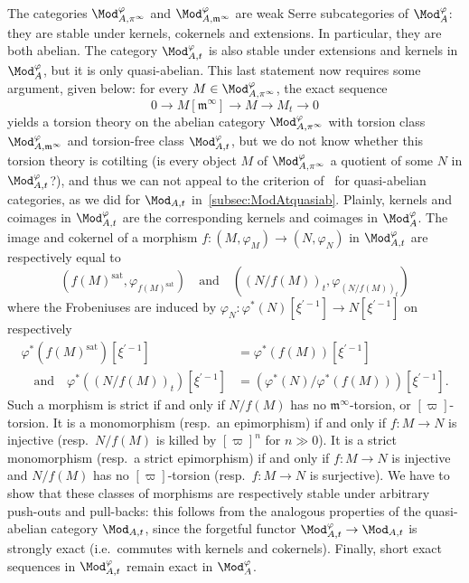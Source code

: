 The categories $\Mod_{A,\pi^{\infty}}^{\varphi}$ and $\Mod_{A,\mathfrak{m}^{\infty}}^{\varphi}$ are weak Serre subcategories of $\Mod_{A}^{\varphi}$: they are stable under kernels, cokernels and extensions. In particular, they are both abelian. The category $\Mod_{A,t}^{\varphi}$ is also stable under extensions and kernels in $\Mod_{A}^{\varphi}$, but it is only quasi-abelian. This last statement now requires some argument, given below: for every $M\in\Mod_{A,\pi^{\infty}}^{\varphi}$, the exact sequence
\[
0\rightarrow M[\mathfrak{m}^{\infty}]\rightarrow M\rightarrow M_{t}\rightarrow0
\]
yields a torsion theory on the abelian category $\Mod_{A,\pi^{\infty}}^{\varphi}$ with torsion class $\Mod_{A,\mathfrak{m}^{\infty}}^{\varphi}$ and torsion-free class $\Mod_{A,t}^{\varphi}$, but we do not know whether this torsion theory is cotilting (is every object $M$ of $\Mod_{A,\pi^{\infty}}^{\varphi}$ a quotient of some $N$ in $\Mod_{A,t}^{\varphi}$?), and thus we can not appeal to the criterion of~\cite[B.3]{BoVdB03} for quasi-abelian categories, as we did for $\Mod_{A,t}$ in~\ref{subsec:ModAtquasiab}. Plainly, kernels and coimages in $\Mod_{A,t}^{\varphi}$ are the corresponding kernels and coimages in $\Mod_{A}^{\varphi}$. The image and cokernel of a morphism $f:(M,\varphi_{M})\rightarrow(N,\varphi_{N})$ in $\Mod_{A,t}^{\varphi}$ are respectively equal to
\[
\left(f(M)^{\mathrm{sat}},\varphi_{f(M)^{\mathrm{sat}}}\right)\quad\text{and}\quad\left(\left(N/f(M)\right)_{t},\varphi_{(N/f(M))_{t}}\right)
\]
where the Frobeniuses are induced by $\varphi_{N}:\varphi^{\ast}(N)[\xi^{\prime-1}]\rightarrow N[\xi^{\prime-1}]$ on respectively
\begin{align*}
\varphi^{\ast}\left(f(M)^{\mathrm{sat}}\right)[\xi^{\prime-1}] & = \varphi^{\ast}\left(f(M)\right)[\xi^{\prime-1}]\\
\quad\text{and}\quad\varphi^{\ast}\left(\left(N/f(M)\right)_{t}\right)[\xi^{\prime-1}] & = \left(\varphi^{\ast}\left(N\right)/\varphi^{\ast}\left(f(M)\right)\right)[\xi^{\prime-1}].
\end{align*}
Such a morphism is strict if and only if $N/f(M)$ has no $\mathfrak{m}^{\infty}$-torsion, or $[\varpi]$-torsion. It is a monomorphism (resp.~an epimorphism) if and only if $f:M\rightarrow N$ is injective (resp.~$N/f(M)$ is killed by $[\varpi]^{n}$ for $n\gg0$). It is a strict monomorphism (resp.~a strict epimorphism) if and only if $f:M\rightarrow N$ is injective and $N/f(M)$ has no $[\varpi]$-torsion (resp.~$f:M\rightarrow N$ is surjective). We have to show that these classes of morphisms are respectively stable under arbitrary push-outs and pull-backs: this follows from the analogous properties of the quasi-abelian category $\Mod_{A,t}$, since the forgetful functor $\Mod_{A,t}^{\varphi}\rightarrow\Mod_{A,t}$ is strongly exact (i.e.~commutes with kernels and cokernels). Finally, short exact sequences in $\Mod_{A,t}^{\varphi}$ remain exact in $\Mod_{A}^{\varphi}$.

